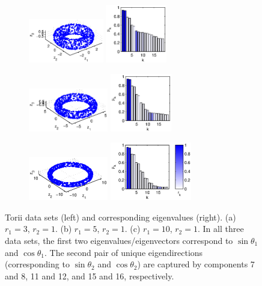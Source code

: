 \documentclass[preprint]{elsarticle}
\begin{document}
\begin{figure}[t]
%
\begin{subfigure}{0.3\textwidth}
\centering
\includegraphics[height=0.75in]{torus1}
\includegraphics[height=1in]{torus1_evals}
\caption{}
\end{subfigure}
%
\hfill
%
\begin{subfigure}{0.32\textwidth}
\centering
\includegraphics[height=0.75in]{torus2}
\includegraphics[height=1in]{torus2_evals}
\caption{}
\end{subfigure}
%
\hfill
%
\begin{subfigure}{0.35\textwidth}
\centering
\includegraphics[height=0.75in]{torus3}
\includegraphics[height=1in]{torus3_evals}
\caption{}
\end{subfigure}
%
\hfill
%
\caption{Torii data sets (left) and corresponding eigenvalues (right). (a) $r_1 = 3$, $r_2 = 1$. (b) $r_1 = 5$, $r_2 = 1$. (c) $r_1 = 10$, $r_2 = 1$. In all three data sets, the first two eigenvalues/eigenvectors correspond to $\sin \theta_1$ and $\cos \theta_1$. The second pair of unique eigendirections (corresponding to $\sin \theta_2$ and $\cos \theta_2$) are captured by components 7 and 8, 11 and 12, and 15 and 16, respectively.}
%
\label{fig:torus}
%
\end{figure}
\end{document}
